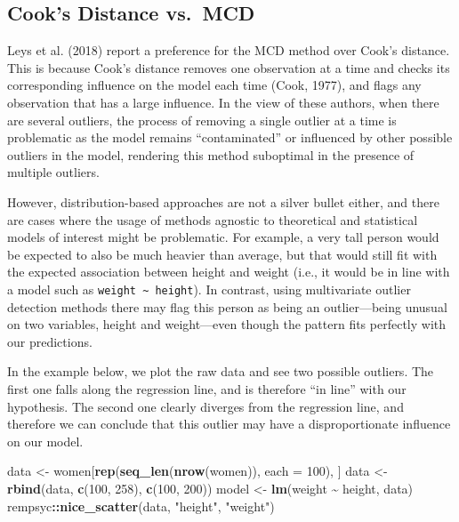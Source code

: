 \documentclass{article}
\newenvironment{Shaded}{\begin{snugshade}}{\end{snugshade}}
\newcommand{\AttributeTok}[1]{\textcolor[rgb]{0.13,0.29,0.53}{#1}}
\newcommand{\DecValTok}[1]{\textcolor[rgb]{0.00,0.00,0.81}{#1}}
\newcommand{\FunctionTok}[1]{\textcolor[rgb]{0.13,0.29,0.53}{\textbf{#1}}}
\newcommand{\NormalTok}[1]{#1}
\newcommand{\OtherTok}[1]{\textcolor[rgb]{0.56,0.35,0.01}{#1}}
\newcommand{\SpecialCharTok}[1]{\textcolor[rgb]{0.81,0.36,0.00}{\textbf{#1}}}
\newcommand{\StringTok}[1]{\textcolor[rgb]{0.31,0.60,0.02}{#1}}
\begin{document}
\hypertarget{cooks-distance-vs.-mcd}{%
\subsection{Cook's Distance vs.~MCD}\label{cooks-distance-vs.-mcd}}

Leys et al. (2018) report a preference for the MCD method over Cook's
distance. This is because Cook's distance removes one observation at a
time and checks its corresponding influence on the model each time
(Cook, 1977), and flags any observation that has a large influence. In
the view of these authors, when there are several outliers, the process
of removing a single outlier at a time is problematic as the model
remains ``contaminated'' or influenced by other possible outliers in the
model, rendering this method suboptimal in the presence of multiple
outliers.

However, distribution-based approaches are not a silver bullet either,
and there are cases where the usage of methods agnostic to theoretical
and statistical models of interest might be problematic. For example, a
very tall person would be expected to also be much heavier than average,
but that would still fit with the expected association between height
and weight (i.e., it would be in line with a model such as
\texttt{weight\ \textasciitilde{}\ height}). In contrast, using
multivariate outlier detection methods there may flag this person as
being an outlier---being unusual on two variables, height and
weight---even though the pattern fits perfectly with our predictions.

In the example below, we plot the raw data and see two possible
outliers. The first one falls along the regression line, and is
therefore ``in line'' with our hypothesis. The second one clearly
diverges from the regression line, and therefore we can conclude that
this outlier may have a disproportionate influence on our model.

\begin{Shaded}
\begin{Highlighting}[]
\NormalTok{data }\OtherTok{\textless{}{-}}\NormalTok{ women[}\FunctionTok{rep}\NormalTok{(}\FunctionTok{seq\_len}\NormalTok{(}\FunctionTok{nrow}\NormalTok{(women)), }\AttributeTok{each =} \DecValTok{100}\NormalTok{), ]}
\NormalTok{data }\OtherTok{\textless{}{-}} \FunctionTok{rbind}\NormalTok{(data, }\FunctionTok{c}\NormalTok{(}\DecValTok{100}\NormalTok{, }\DecValTok{258}\NormalTok{), }\FunctionTok{c}\NormalTok{(}\DecValTok{100}\NormalTok{, }\DecValTok{200}\NormalTok{))}
\NormalTok{model }\OtherTok{\textless{}{-}} \FunctionTok{lm}\NormalTok{(weight }\SpecialCharTok{\textasciitilde{}}\NormalTok{ height, data)}
\NormalTok{rempsyc}\SpecialCharTok{::}\FunctionTok{nice\_scatter}\NormalTok{(data, }\StringTok{"height"}\NormalTok{, }\StringTok{"weight"}\NormalTok{)}
\end{Highlighting}
\end{Shaded}
\end{document}
